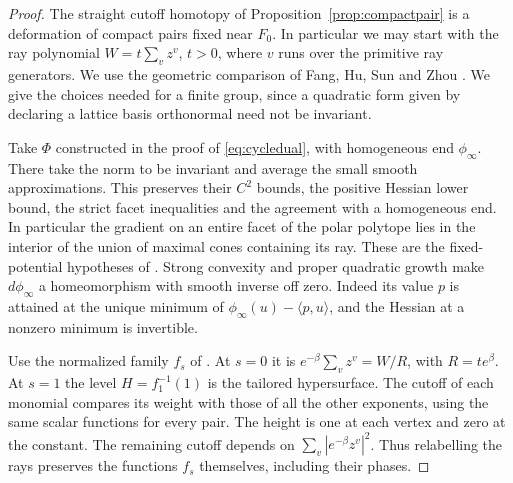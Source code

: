\begin{proof}
The straight cutoff homotopy of Proposition~\ref{prop:compactpair} is a deformation of compact pairs fixed near $F_0$. In particular we may start with the ray polynomial $W=t\sum_{v}z^v$, $t>0$, where $v$ runs over the primitive ray generators. We use the geometric comparison of Fang, Hu, Sun and Zhou \cite{FHSZ}. We give the choices needed for a finite group, since a quadratic form given by declaring a lattice basis orthonormal need not be invariant.

Take $\Phi$ constructed in the proof of \eqref{eq:cycledual}, with homogeneous end $\phi_\infty$. There take the norm to be invariant and average the small smooth approximations. This preserves their $C^2$ bounds, the positive Hessian lower bound, the strict facet inequalities and the agreement with a homogeneous end. In particular the gradient on an entire facet of the polar polytope lies in the interior of the union of maximal cones containing its ray. These are the fixed-potential hypotheses of \cite[Appendix D, condition D.9, and \S T.16]{FHSZ}. Strong convexity and proper quadratic growth make $d\phi_\infty$ a homeomorphism with smooth inverse off zero. Indeed its value $p$ is attained at the unique minimum of $\phi_\infty(u)-\langle p,u\rangle$, and the Hessian at a nonzero minimum is invertible.

Use the normalized family $f_s$ of \cite[\S M.1, M.6--M.7]{FHSZ}. At $s=0$ it is $e^{-\beta}\sum_v z^v=W/R$, with $R=t e^\beta$. At $s=1$ the level $H=f_1^{-1}(1)$ is the tailored hypersurface. The cutoff of each monomial compares its weight with those of all the other exponents, using the same scalar functions for every pair. The height is one at each vertex and zero at the constant. The remaining cutoff depends on $\sum_v |e^{-\beta}z^v|^2$. Thus relabelling the rays preserves the functions $f_s$ themselves, including their phases.


\end{proof}
